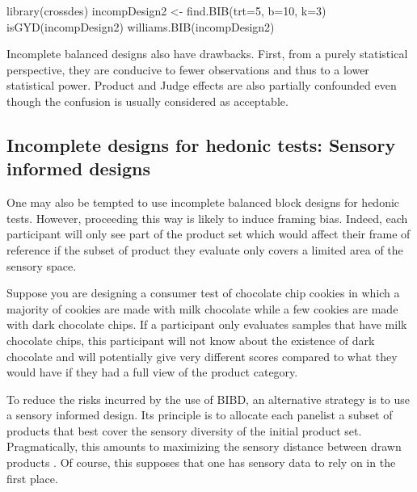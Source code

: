\documentclass[
]{krantz}
\makeatletter
\newenvironment{Shaded}{\begin{snugshade}}{\end{snugshade}}
\newcommand{\AttributeTok}[1]{\textcolor[rgb]{0.61,0.61,0.61}{#1}}
\newcommand{\DecValTok}[1]{\textcolor[rgb]{0.06,0.06,0.06}{#1}}
\newcommand{\FunctionTok}[1]{\textcolor[rgb]{0,0,0}{#1}}
\newcommand{\NormalTok}[1]{#1}
\newcommand{\OtherTok}[1]{\textcolor[rgb]{0.37,0.37,0.37}{#1}}
\newenvironment{kframe}{%
\medskip{}
\setlength{\fboxsep}{.8em}
 \def\at@end@of@kframe{}%
 \ifinner\ifhmode%
  \def\at@end@of@kframe{\end{minipage}}%
  \begin{minipage}{\columnwidth}%
 \fi\fi%
 \def\FrameCommand##1{\hskip\@totalleftmargin \hskip-\fboxsep
 \colorbox{shadecolor}{##1}\hskip-\fboxsep
     \hskip-\linewidth \hskip-\@totalleftmargin \hskip\columnwidth}%
 \MakeFramed {\advance\hsize-\width
   \@totalleftmargin\z@ \linewidth\hsize
   \@setminipage}}%
 {\par\unskip\endMakeFramed%
 \at@end@of@kframe}
\renewenvironment{Shaded}{\begin{kframe}}{\end{kframe}}
\makeatother
\begin{document}
\begin{Shaded}
\begin{Highlighting}[]
\FunctionTok{library}\NormalTok{(crossdes)}
\NormalTok{incompDesign2 }\OtherTok{\textless{}{-}} \FunctionTok{find.BIB}\NormalTok{(}\AttributeTok{trt=}\DecValTok{5}\NormalTok{, }\AttributeTok{b=}\DecValTok{10}\NormalTok{, }\AttributeTok{k=}\DecValTok{3}\NormalTok{)}
\FunctionTok{isGYD}\NormalTok{(incompDesign2)}
\FunctionTok{williams.BIB}\NormalTok{(incompDesign2)}
\end{Highlighting}
\end{Shaded}

Incomplete balanced designs also have drawbacks. First, from a purely statistical perspective, they are conducive to fewer observations and thus to a lower statistical power. Product and Judge effects are also partially confounded even though the confusion is usually considered as acceptable.

\hypertarget{incomplete-designs-for-hedonic-tests-sensory-informed-designs}{%
\subsection{Incomplete designs for hedonic tests: Sensory informed designs}\label{incomplete-designs-for-hedonic-tests-sensory-informed-designs}}

One may also be tempted to use incomplete balanced block designs for hedonic tests. However, proceeding this way is likely to induce framing bias. Indeed, each participant will only see part of the product set which would affect their frame of reference if the subset of product they evaluate only covers a limited area of the sensory space.

Suppose you are designing a consumer test of chocolate chip cookies in which a majority of cookies are made with milk chocolate while a few cookies are made with dark chocolate chips. If a participant only evaluates samples that have milk chocolate chips, this participant will not know about the existence of dark chocolate and will potentially give very different scores compared to what they would have if they had a full view of the product category.

To reduce the risks incurred by the use of BIBD, an alternative strategy is to use a sensory informed design. Its principle is to allocate each panelist a subset of products that best cover the sensory diversity of the initial product set. Pragmatically, this amounts to maximizing the sensory distance between drawn products \citep{Franczak2015}. Of course, this supposes that one has sensory data to rely on in the first place.
\end{document}
